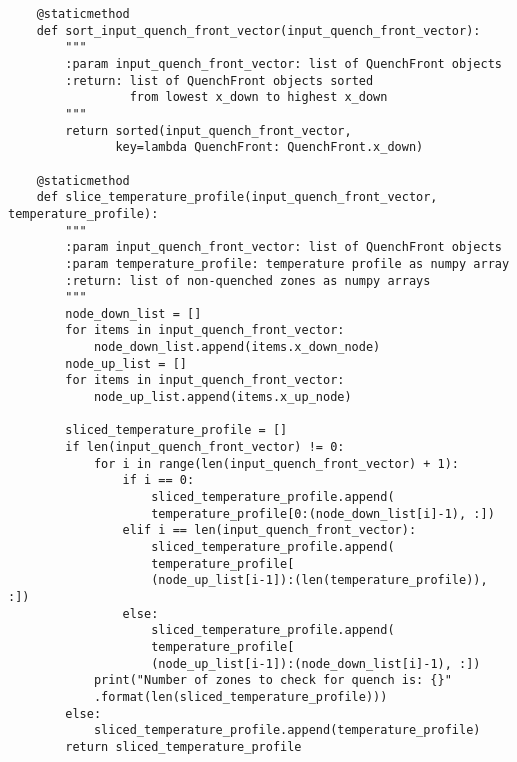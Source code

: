 \begin{verbatim}
    @staticmethod
    def sort_input_quench_front_vector(input_quench_front_vector):
        """
        :param input_quench_front_vector: list of QuenchFront objects
        :return: list of QuenchFront objects sorted 
                 from lowest x_down to highest x_down
        """
        return sorted(input_quench_front_vector, 
               key=lambda QuenchFront: QuenchFront.x_down)

    @staticmethod
    def slice_temperature_profile(input_quench_front_vector, temperature_profile):
        """
        :param input_quench_front_vector: list of QuenchFront objects
        :param temperature_profile: temperature profile as numpy array
        :return: list of non-quenched zones as numpy arrays
        """
        node_down_list = []
        for items in input_quench_front_vector:
            node_down_list.append(items.x_down_node)
        node_up_list = []
        for items in input_quench_front_vector:
            node_up_list.append(items.x_up_node)

        sliced_temperature_profile = []
        if len(input_quench_front_vector) != 0:
            for i in range(len(input_quench_front_vector) + 1):
                if i == 0:
                    sliced_temperature_profile.append(
                    temperature_profile[0:(node_down_list[i]-1), :])
                elif i == len(input_quench_front_vector):
                    sliced_temperature_profile.append(
                    temperature_profile[
                    (node_up_list[i-1]):(len(temperature_profile)), :])
                else:
                    sliced_temperature_profile.append(
                    temperature_profile[
                    (node_up_list[i-1]):(node_down_list[i]-1), :])
            print("Number of zones to check for quench is: {}"
            .format(len(sliced_temperature_profile)))
        else:
            sliced_temperature_profile.append(temperature_profile)
        return sliced_temperature_profile


\end{verbatim}
